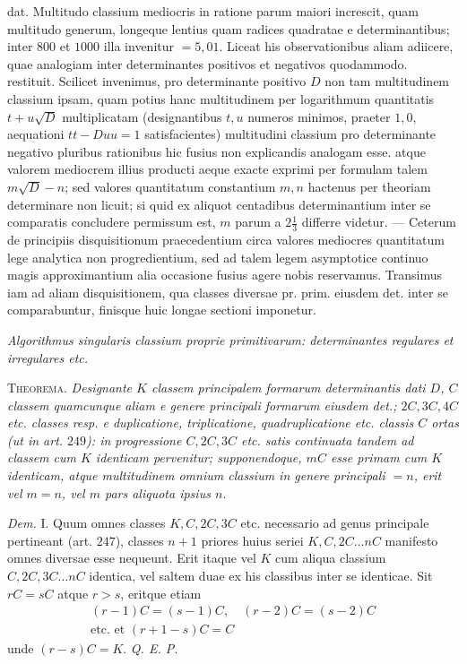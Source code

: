 dat. Multitudo classium mediocris in ratione parum maiori increscit, quam multitudo generum, longeque lentius quam radices quadratae e determinantibus; inter \(800\) et \(1000\) illa invenitur \(=5,01\). Liceat his observationibus aliam adiicere, quae analogiam inter determinantes positivos et negativos quodammodo. restituit. Scilicet invenimus, pro determinante positivo \(D\) non tam multitudinem classium ipsam, quam potius hanc multitudinem per logarithmum quantitatis \(t+u\surd D\) multiplicatam (designantibus \(t,u\) numeros minimos, praeter \(1,0\), aequationi \(tt-Duu=1\) satisfacientes) multitudini classium pro determinante negativo pluribus rationibus hic fusius non explicandis analogam esse. atque valorem mediocrem illius producti aeque exacte exprimi per formulam talem \(m\surd D-n\); sed valores quantitatum constantium \(m,n\) hactenus per theoriam determinare non licuit; si quid ex aliquot centadibus determinantium inter se comparatis concludere permissum est, \(m\) parum a \(2\frac13\) differre videtur. — Ceterum de principiis disquisitionum praecedentium circa valores mediocres quantitatum lege analytica non progredientium, sed ad talem legem asymptotice continuo magis approximantium alia occasione fusius agere nobis reservamus. Transimus iam ad aliam disquisitionem, qua classes diversae pr. prim. eiusdem det. inter se comparabuntur, finisque huic longae sectioni imponetur.

\begin{center}\textit{Algorithmus singularis classium proprie primitivarum: determinantes regulares et irregulares etc.}\end{center}

\textsc{Theorema.} \textit{Designante \(K\) classem principalem formarum determinantis dati \(D\), \(C\) classem quamcunque aliam e genere principali formarum eiusdem det.; \(2C,3C, 4C\) etc. classes resp. e duplicatione, triplicatione, quadruplicatione etc. classis \(C\) ortas (ut in art. \(249\)): in progressione \(C,2C,3C\) etc. satis continuata tandem ad classem cum \(K\) identicam pervenitur; supponendoque, \(mC\) esse primam cum \(K\) identicam, atque multitudinem omnium classium in genere principali \(=n\), erit vel \(m=n\), vel \(m\) pars aliquota ipsius \(n\).}

\textit{Dem.} I. Quum omnes classes \(K,C,2C,3C\) etc. necessario ad genus principale pertineant (art. \(247\)), classes \(n+1\) priores huius seriei \(K,C,2C\ldots nC\) manifesto omnes diversae esse nequeunt. Erit itaque vel \(K\) cum aliqua classium \(C,2C,3C\ldots nC\) identica, vel saltem duae ex his classibus inter se identicae.
Sit \(rC=sC\) atque \(r>s\), eritque etiam
\[\begin{gathered}(r-1)C=(s-1)C,\quad(r-2)C=(s-2)C\\\text{etc. et }(r+1-s)C=C\end{gathered}\]
unde \((r-s)C=K\). \textit{Q. E. P.}

